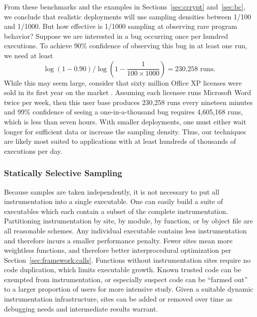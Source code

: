 From these benchmarks and the examples in Sections~\ref{sec:ccrypt}
and~\ref{sec:bc}, we conclude that realistic deployments will use
sampling densities between 1/100 and 1/1000.  But how effective is
1/1000 sampling at observing rare program behavior?  Suppose we are
interested in a bug occurring once per hundred executions.  To achieve
90\% confidence of observing this bug in at least one run, we need at
least
\[\log{(1-0.90)} / \log{\left( 1 - \frac{1}{100 \times 1000}\right)} = \text{230,258 runs.}\]
While this may seem large, consider that sixty million Office XP
licenses were sold in its first year on the market
\cite{Microsoft:2002:AR-F10K}.  Assuming each licensee runs Microsoft
Word twice per week, then this user base produces 230,258 runs every
nineteen minutes and 99\% confidence of seeing a one-in-a-thousand bug
requires 4,605,168 runs, which is less than seven hours.  With smaller
deployments, one must either wait longer for sufficient data or
increase the sampling density.  Thus, our techniques are likely most
suited to applications with at least hundreds of thousands of
executions per day.

\subsubsection{Statically Selective Sampling}
\label{sec:ccured:single}

Because samples are taken independently, it is not necessary to put
all instrumentation into a single executable.  One can easily build a
suite of executables which each contain a subset of the complete
instrumentation.  Partitioning instrumentation by site, by module, by
function, or by object file are all reasonable schemes.  Any
individual executable contains less instrumentation and therefore
incurs a smaller performance penalty.  Fewer sites mean more
weightless functions, and therefore better interprocedural
optimization per Section~\ref{sec:framework:calls}.  Functions without
instrumentation sites require no code duplication, which limits
executable growth.  Known trusted code can be exempted from
instrumentation, or especially suspect code can be ``farmed out'' to a
larger proportion of users for more intensive study.  Given a suitable
dynamic instrumentation infrastructure, sites can be added or removed
over time as debugging needs and intermediate results warrant.

